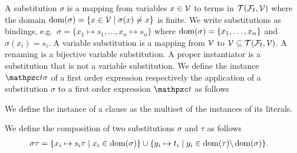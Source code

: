 


\begin{definition}\label{def:substitution}
	A {\myem substitution} $\sigma$ is a mapping from variables $x\in{\mathcal V}$ to terms in ${{\mathcal T}({\mathcal F}_{\mathsf f},{\mathcal V})}$
	where the {\myem domain }$\operatorname{dom}(\sigma) = \{ x\in{\mathcal V}\mid\sigma(x) \neq x \}$ is finite.
	We write substitutions as bindings, e.g.~$\sigma=\{ x_1\mapsto s_1,\ldots,x_n\mapsto s_n \}$
	where $\operatorname{dom}(\sigma)=\{ x_1,\ldots,x_n \}$ and $\sigma(x_i)=s_i$.
	A {\myem variable substitution} is a mapping from ${\mathcal V}$ to ${\mathcal V}\subseteq{{\mathcal T}({\mathcal F}_{\mathsf f},{\mathcal V})}$.
	A {\myem renaming} is a bijective variable substitution.
	A {\myem proper instantiator} is a substitution that is not a variable substitution.
	We define the instance $\mct\sigma$ of a first order expression
	respectively the application of a substitution $\sigma$ to a first order expression $\mct$ as follows

\noindent We define the instance of a clause as the multiset of the instances of its literals.
\end{definition}

\begin{definition}\label{def:substcomp}
We define the {\myem composition} of two substitutions $\sigma$ and $\tau$ as follows
	\begin{align*}
		\sigma\tau&=\{ x_i\mapsto s_i\tau\mid x_i\in\operatorname{dom}(\sigma) \}
		\cup
		\{ y_i\mapsto t_i\mid y_i\in\operatorname{dom}(\tau) \backslash \operatorname{dom}(\sigma) \}.
	\end{align*}
\end{definition}



